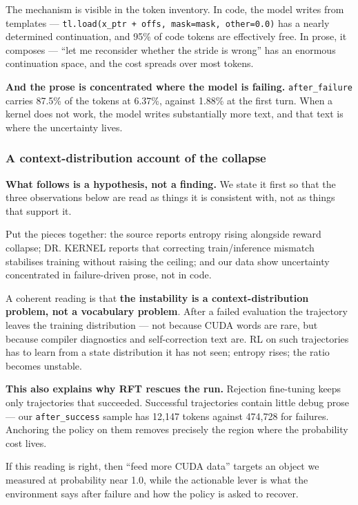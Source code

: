 \documentclass[
  11pt,
]{article}
\begin{document}
The mechanism is visible in the token inventory. In code, the model
writes from templates ---
\texttt{tl.load(x\_ptr\ +\ offs,\ mask=mask,\ other=0.0)} has a nearly
determined continuation, and 95\% of code tokens are effectively free.
In prose, it composes --- ``let me reconsider whether the stride is
wrong'' has an enormous continuation space, and the cost spreads over
most tokens.

\textbf{And the prose is concentrated where the model is failing.}
\texttt{after\_failure} carries 87.5\% of the tokens at 6.37\%, against
1.88\% at the first turn. When a kernel does not work, the model writes
substantially more text, and that text is where the uncertainty lives.

\hypertarget{a-context-distribution-account-of-the-collapse}{%
\subsubsection{A context-distribution account of the
collapse}\label{a-context-distribution-account-of-the-collapse}}

\textbf{What follows is a hypothesis, not a finding.} We state it first
so that the three observations below are read as things it is consistent
with, not as things that support it.

Put the pieces together: the source reports entropy rising alongside
reward collapse; DR. KERNEL reports that correcting train/inference
mismatch stabilises training without raising the ceiling; and our data
show uncertainty concentrated in failure-driven prose, not in code.

A coherent reading is that \textbf{the instability is a
context-distribution problem, not a vocabulary problem}. After a failed
evaluation the trajectory leaves the training distribution --- not
because CUDA words are rare, but because compiler diagnostics and
self-correction text are. RL on such trajectories has to learn from a
state distribution it has not seen; entropy rises; the ratio becomes
unstable.

\textbf{This also explains why RFT rescues the run.} Rejection
fine-tuning keeps only trajectories that succeeded. Successful
trajectories contain little debug prose --- our \texttt{after\_success}
sample has 12,147 tokens against 474,728 for failures. Anchoring the
policy on them removes precisely the region where the probability cost
lives.

If this reading is right, then ``feed more CUDA data'' targets an object
we measured at probability near 1.0, while the actionable lever is what
the environment says after failure and how the policy is asked to
recover.
\end{document}
